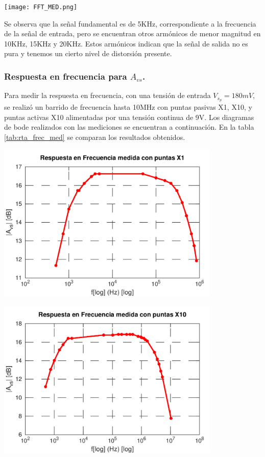 \documentclass[a4paper, 10pt, spanish]{article}
\begin{document}
\begin{center}
  \texttt{[image: FFT\_MED.png]}
  \label{fig:fft_med}
\end{center}

Se observa que la señal fundamental es de 5KHz, correspondiente a la frecuencia de la señal de entrada, pero se encuentran otros armónicos de menor magnitud en 10KHz, 15KHz y 20KHz. Estos armónicos indican que la señal de salida no es pura y tenemos un cierto nivel de distorsión presente.

\subsubsection{Respuesta en frecuencia para $A_{vs}$.}
Para medir la respuesta en frecuencia, con una tensión de entrada $V_{s_p}=180mV$, se realizó un barrido de frecuencia hasta 10MHz con puntas pasivas X1, X10, y puntas activas X10 alimentadas por una tensión continua de 9V. Los diagramas de bode realizados con las mediciones se encuentran a continuación. En la tabla \ref{tab:rta_frec_med} se comparan los resultados obtenidos.

\begin{center}
  \includegraphics[width=0.8\textwidth]{X1.png}
  \label{fig:X1_med}
\end{center}

\begin{center}
  \includegraphics[width=0.8\textwidth]{X10.png}
  \label{fig:X10_med}
\end{center}
\end{document}
